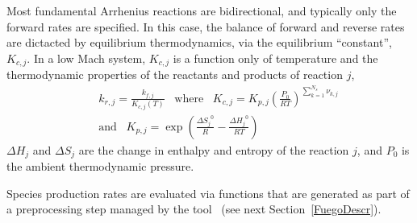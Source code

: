 Most fundamental Arrhenius reactions are bidirectional, and typically only the forward rates are specified. In this case, the balance of forward and reverse rates are dictacted by equilibrium thermodynamics, via the equilibrium ``constant'', $K_{c,j}$.  In a low Mach system, $K_{c,j}$ is a function only of temperature and the thermodynamic properties of the reactants and products of reaction $j$,
\begin{eqnarray*}
&&k_{r,j} = \frac{k_{f,j}}{K_{c,j}(T)} \;\;\; \mbox{where} \;\;\; K_{c,j}=K_{p,j} \left( \frac{P_{0}}{RT} \right)^{\sum_{k=1}^{N_s} \nu_{k,j}}
\\
&&\mbox{and} \;\;\; K_{p,j}=\exp \left( \frac{\Delta {S_j}^{0}}{R} - \frac{\Delta {H_j}^{0}}{RT} \right)
\end{eqnarray*}
$\Delta H_j$ and $\Delta S_j$ are the change in enthalpy and entropy of the reaction $j$, and $P_0$ is the ambient thermodynamic pressure.

Species production rates are evaluated via functions that are generated as part of a preprocessing step managed by the tool \fuego\ (see next Section~\ref{FuegoDescr}).

